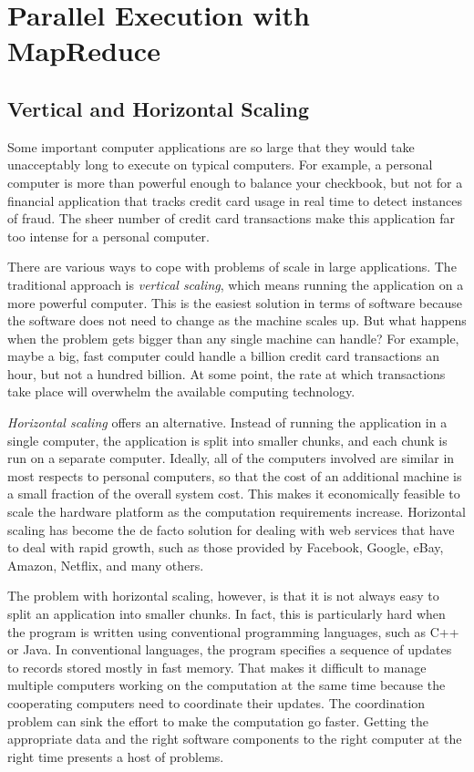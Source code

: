 \chapter{Parallel Execution with MapReduce}

\section{Vertical and Horizontal Scaling}

Some important computer applications are so large that they would take
unacceptably long to execute on typical computers.  For
example, a personal computer is more than powerful enough
to balance your checkbook, but not for a financial
application that tracks credit card usage in real time to
detect instances of fraud.  The sheer number of credit card
transactions make this application far too intense for a
personal computer.

There are various ways to cope
with problems of scale  in large applications.
The traditional approach is
\emph{vertical scaling},
which means running the
application on a more powerful computer.
This is the easiest solution in terms of software
because the software does not need to change as the machine scales up.
But what happens when the problem gets bigger than any single machine can handle?
For example, maybe a big, fast computer could handle
a billion credit card transactions an hour,
but not a hundred billion.
At some point, the rate at which transactions take place
will overwhelm the available computing technology.

\emph{Horizontal scaling}
offers an alternative.  Instead of
running the application in a single computer,
the application is split into smaller
chunks, and each chunk is run on a separate computer.
Ideally, all of the computers involved are similar in most respects
to personal computers, so that the cost of an additional
machine is a small fraction of the overall system cost.
This makes it economically feasible to scale the
hardware platform as the computation requirements increase.
Horizontal scaling has become the de facto
solution for dealing with web services that have to deal
with rapid growth, such as those provided by
Facebook, Google, eBay, Amazon, Netflix, and many others.

The problem with horizontal scaling, however, is that it is
not always easy to split an application into smaller
chunks.  In fact, this is particularly hard when the program
is written using conventional programming languages, such as
C++ or Java. In conventional languages, the program specifies
a sequence of updates to records stored mostly in fast memory.
That makes it difficult to manage multiple computers
working on the computation at the same time because the
cooperating computers need to coordinate their updates.
The coordination problem can sink the effort to make
the computation go faster.
Getting the appropriate data and the right software
components to the right computer
at the right time presents a host of problems.

